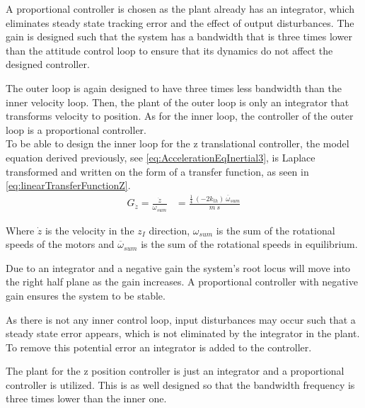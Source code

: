 A proportional controller is chosen as the plant already has an integrator, which eliminates steady state tracking error and the effect of output disturbances. The gain is designed such that the system has a bandwidth that is three times lower than the attitude control loop to ensure that its dynamics do not affect the designed controller. %

The outer loop is again designed to have three times less bandwidth than the inner velocity loop. Then, the plant of the outer loop is only an integrator that transforms velocity to position. As for the inner loop, the controller of the outer loop is a proportional controller. \\

To be able to design the inner loop for the z translational controller, the model equation derived previously, see \autoref{eq:AccelerationEqInertial3}, is Laplace transformed and written on the form of a transfer function, as seen in \autoref{eq:linearTransferFunctionZ}.
%
\begin{align}
G_{\dot{z}}=\frac{\dot{z}}{\omega_{sum}} &= \frac{ \frac{1}{4}\ (-2 k_{th})\ \overline{\omega}_{sum} }{ m\ s } \label{eq:linearTransferFunctionZ}
\end{align}

Where $\dot{z}$ is the velocity in the $z_I$ direction, $\omega_{sum}$ is the sum of the rotational speeds of the motors and $\overline{\omega}_{sum}$ is the sum of the rotational speeds in equilibrium.

Due to an integrator and a negative gain the system's root locus will move into the right half plane as the gain increases. A proportional controller with negative gain ensures the system to be stable. 

As there is not any inner control loop, input disturbances may occur such that a steady state error appears, which is not eliminated by the integrator in the plant. To remove this potential error an integrator is added to the controller. 

The plant for the z position controller is just an integrator and a proportional controller is utilized. This is as well designed so that the bandwidth frequency is three times lower than the inner one.
